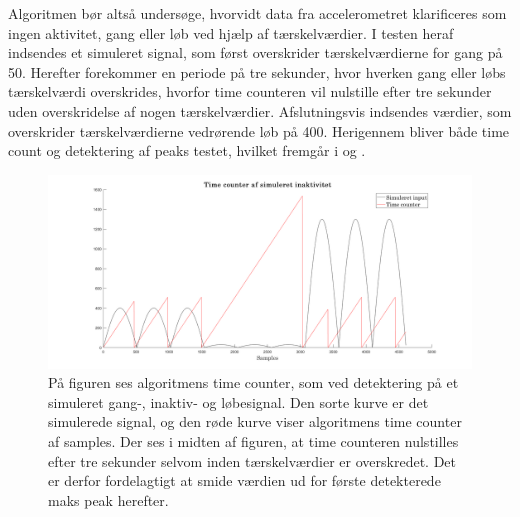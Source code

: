 Algoritmen bør altså undersøge, hvorvidt data fra accelerometret klarificeres som ingen aktivitet, gang eller løb ved hjælp af tærskelværdier. I testen heraf indsendes et simuleret signal, som først overskrider tærskelværdierne for gang på 50. Herefter forekommer en periode på tre sekunder, hvor hverken gang eller løbs tærskelværdi overskrides, hvorfor time counteren vil nulstille efter tre sekunder uden overskridelse af nogen tærskelværdier. Afslutningsvis indsendes værdier, som overskrider tærskelværdierne vedrørende løb på 400. Herigennem bliver både time count og detektering af peaks testet, hvilket fremgår i  og . 
\begin{figure}[H]
	\centering
	\includegraphics[scale=0.35]{figures/cDesign/test_timecount_inaktiv.png}
	\caption{På figuren ses algoritmens time counter, som ved detektering på et simuleret gang-, inaktiv- og løbesignal. Den sorte kurve er det simulerede signal, og den røde kurve viser algoritmens time counter af samples. Der ses i midten af figuren, at time counteren nulstilles efter tre sekunder selvom inden tærskelværdier er overskredet. Det er derfor fordelagtigt at smide værdien ud for første detekterede maks peak herefter.}
	\label{fig:test_inaktiv_time}
\end{figure}\vspace{-0.25cm}


